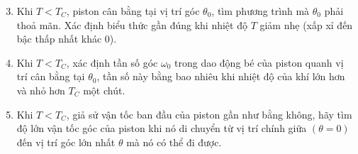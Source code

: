 \begin{enumerate}
  \setcounter{enumi}{2}
  \item Khi $T<T_{C}$, piston cân bằng tại vị trí góc $\theta_{0}$, tìm phương trình mà $\theta_{0}$ phải thoả mãn. Xác định biểu thức gần đúng khi nhiệt độ $T$ giảm nhẹ (xấp xỉ đến bậc thấp nhất khác 0).
  \item Khi $T<T_{C}$, xác định tần số góc $\omega_{0}$ trong dao động bé của piston quanh vị trí cân bằng tại $\theta_{0}$, tần số này bằng bao nhiêu khi nhiệt độ của khí lớn hơn và nhỏ hơn $T_{C}$ một chút.
  \item Khi $T<T_{C}$, giả sử vận tốc ban đầu của piston gần như bằng không, hãy tìm độ lớn vận tốc góc của piston khi nó di chuyển từ vị trí chính giữa $(\theta=0)$ đến vị trí góc lớn nhất $\theta$ mà nó có thể đi được.
\end{enumerate}